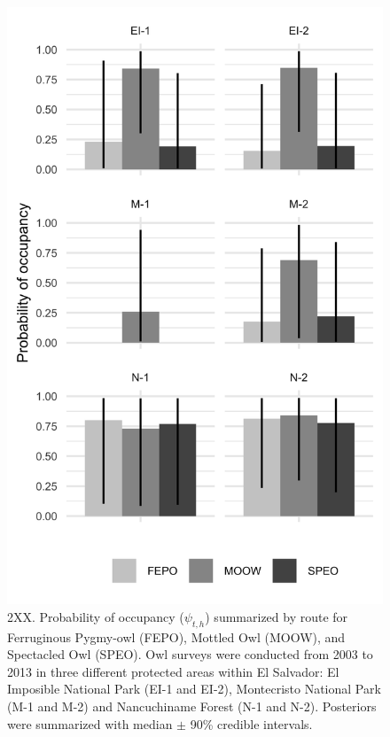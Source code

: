\documentclass[
]{article}
\begin{document}
\begin{figure}
\centering
\includegraphics{../output/figures/psi_means-1.png}
\caption{2XX. Probability of occupancy (\(\psi_{t,h}\)) summarized by
route for Ferruginous Pygmy-owl (FEPO), Mottled Owl (MOOW), and
Spectacled Owl (SPEO). Owl surveys were conducted from 2003 to 2013 in
three different protected areas within El Salvador: El Imposible
National Park (EI-1 and EI-2), Montecristo National Park (M-1 and M-2)
and Nancuchiname Forest (N-1 and N-2). Posteriors were summarized with
median \(\pm\) 90\% credible intervals. \label{psi_means}}
\end{figure}
\end{document}
